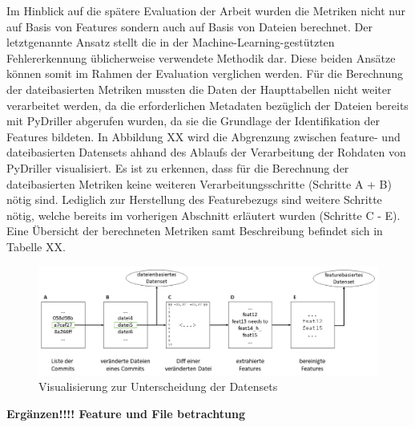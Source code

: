 Im Hinblick auf die spätere Evaluation der Arbeit wurden die Metriken nicht nur auf Basis von Features sondern auch auf Basis von Dateien berechnet. Der letztgenannte Ansatz stellt die in der Machine-Learning-gestützten Fehlererkennung üblicherweise verwendete Methodik dar. Diese beiden Ansätze können somit im Rahmen der Evaluation verglichen werden. Für die Berechnung der dateibasierten Metriken mussten die Daten der Haupttabellen nicht weiter verarbeitet werden, da die erforderlichen Metadaten bezüglich der Dateien bereits mit PyDriller abgerufen wurden, da sie die Grundlage der Identifikation der Features bildeten. In Abbildung XX wird die Abgrenzung zwischen feature- und dateibasierten Datensets ahhand des Ablaufs der Verarbeitung der Rohdaten von PyDriller visualisiert. Es ist zu erkennen, dass für die Berechnung der dateibasierten Metriken keine weiteren Verarbeitungsschritte (Schritte A + B) nötig sind. Lediglich zur Herstellung des Featurebezugs sind weitere Schritte nötig, welche bereits im vorherigen Abschnitt erläutert wurden (Schritte C - E). Eine Übersicht der berechneten Metriken samt Beschreibung befindet sich in Tabelle XX.

\begin{figure}[]
    \centering
    \includegraphics[width=\textwidth]{images/Dataset}
    \caption{Visualisierung zur Unterscheidung der Datensets\label{fig:dataset}}
\end{figure}

\textbf{Ergänzen!!!! Feature und File betrachtung}

